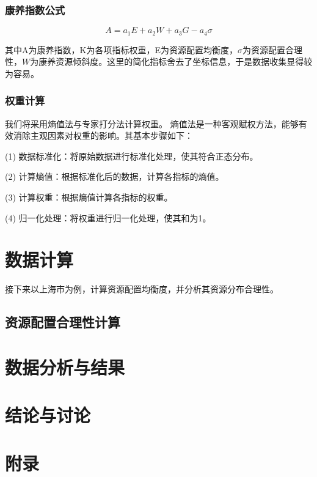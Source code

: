 \documentclass[12pt,a4paper]{article}
\begin{document}
\begin{multicols}{2}
\subsubsection{康养指数公式}

\[
A = a_1E + a_2W + a_3G - a_4\sigma
\]

其中A为康养指数，K为各项指标权重，E为资源配置均衡度，$\sigma$为资源配置合理性，$W$为康养资源倾斜度。这里的简化指标舍去了坐标信息，于是数据收集显得较为容易。

\subsubsection{权重计算}

我们将采用熵值法\cite{02}与专家打分法计算权重。
熵值法是一种客观赋权方法，能够有效消除主观因素对权重的影响。其基本步骤如下：

(1) 数据标准化：将原始数据进行标准化处理，使其符合正态分布。

(2) 计算熵值：根据标准化后的数据，计算各指标的熵值。

(3) 计算权重：根据熵值计算各指标的权重。

(4) 归一化处理：将权重进行归一化处理，使其和为1。



\section{数据计算}

接下来以上海市为例，计算资源配置均衡度，并分析其资源分布合理性。
\subsection{资源配置合理性计算}



\section{数据分析与结果}

\section{结论与讨论}

\end{multicols}
\newpage
\section*{附录}
\end{document}
